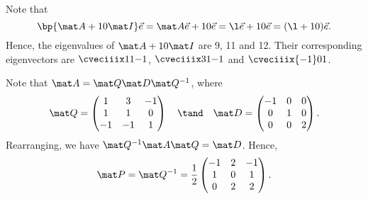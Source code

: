 \begin{solution}
    \begin{ppart}
        Note that \[\bp{\mat A + 10\mat I} \vec e = \mat A \vec e + 10 \vec e = \l \vec e + 10 \vec e = (\l + 10) \vec e.\] Hence, the eigenvalues of $\mat A + 10\mat I$ are 9, 11 and 12. Their corresponding eigenvectors are $\cveciiix11{-1}$, $\cveciiix31{-1}$ and $\cveciiix{-1}01$.
    \end{ppart}
    \begin{ppart}
        Note that $\mat A = \mat Q \mat D \mat Q^{-1}$, where \[\mat Q = \begin{pmatrix}1 & 3 & -1 \\ 1 & 1 & 0 \\ -1 & -1 & 1\end{pmatrix} \quad \tand \quad \mat D = \begin{pmatrix}-1 & 0 & 0 \\ 0 & 1 & 0 \\ 0 & 0 & 2\end{pmatrix}.\] Rearranging, we have $\mat Q^{-1} \mat A \mat Q = \mat D$. Hence, \[\mat P = \mat Q^{-1} = \frac12 \begin{pmatrix}-1 & 2 & -1 \\ 1 & 0 & 1 \\ 0 & 2 & 2\end{pmatrix}.\]
    \end{ppart}
\end{solution}

